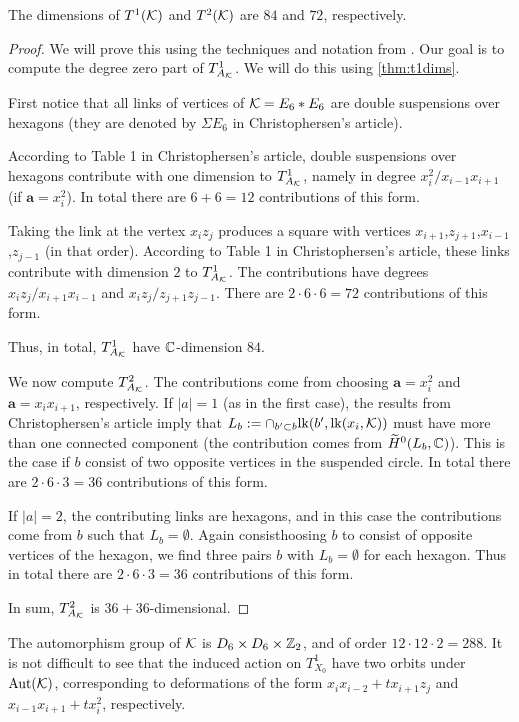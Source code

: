 \begin{lemma}
The dimensions of $T^1(\mathcal{K})$ and $T^2(\mathcal{K})$ are $84$ and $72$, respectively.
\end{lemma}
\begin{proof}
We will prove this using the techniques and notation from \cite{deforming_christophersen}. Our goal is to compute the degree zero part of $T^1_{A_{\mathcal{K}}}$. We will do this using \cref{thm:t1dims}.

First notice that all links of vertices of $\mathcal{K}=E_6 \ast E_6$ are double suspensions over hexagons (they are denoted by $\Sigma E_6$ in Christophersen's article). 

According to Table 1 in Christophersen's article, double suspensions over hexagons contribute with one dimension to $T^1_{A_{\mathcal{K}}}$, namely in degree $x_i^2/x_{i-1}x_{i+1}$ (if $\mathbf a =x_i^2$). In total there are $6+6=12$ contributions of this form.

Taking the link at the vertex $x_iz_j$ produces a square with vertices $x_{i+1}$,$z_{j+1}$,$x_{i-1}$,$z_{j-1}$ (in that order). According to Table 1 in Christophersen's article, these links contribute with dimension $2$ to $T^1_{A_{\mathcal{K}}}$. The contributions have degrees $x_iz_j/x_{i+1}x_{i-1}$ and $x_iz_j/z_{j+1}z_{j-1}$. There are $2 \cdot 6 \cdot 6=72$ contributions of this form.

Thus, in total, $T^1_{A_{\mathcal{K}}}$ have $\mathbb{C}$-dimension $84$.

We now compute $T^2_{A_{\mathcal{K}}}$. The contributions come from choosing $\mathbf a=x_i^2$ and $\mathbf a=x_ix_{i+1}$, respectively. If $|a|=1$ (as in the first case), the results from Christophersen's article imply that $L_b := \cap_{b' \subset b} \mathrm{lk}(b',\mathrm{lk}(x_i,\mathcal{K}))$ must have more than one connected component (the contribution comes from $\widetilde H^0(L_b,\mathbb{C})$). This is the case if $b$ consist of two opposite vertices in the suspended circle. In total there are $2 \cdot 6 \cdot 3=36$ contributions of this form. 

If $|a|=2$, the contributing links are hexagons, and in this case the contributions come from $b$ such that $L_b=\emptyset$. Again consisthoosing $b$ to consist of opposite vertices of the hexagon, we find three pairs $b$ with $L_b=\emptyset$ for each hexagon. Thus in total there are $2 \cdot 6 \cdot 3=36$ contributions of this form.

In sum, $T^2_{A_{\mathcal{K}}}$ is $36+36$-dimensional.
\end{proof}

The automorphism group of $\mathcal{K}$ is $D_6 \times D_6 \times \mathbb{Z}_2$, and of order $12 \cdot 12 \cdot 2=288$. It is not difficult to see that the induced action on $T_{X_0}^1$ have two orbits under $\operatorname{Aut}(\mathcal{K})$, corresponding to deformations of the form $x_ix_{i-2}+t x_{i+1}z_j$ and $x_{i-1}x_{i+1}+tx_i^2$, respectively. 

